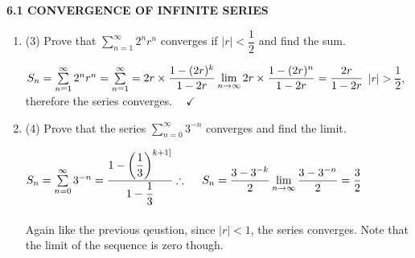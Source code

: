\documentclass[fleqn]{article}
\begin{document}
  \textbf{6.1 CONVERGENCE OF INFINITE SERIES}
  \begin{enumerate}

          

    \item (3) Prove that $\sum\limits_{n=1}^{\infty} 2^n r^n$ converges if $|r| < \dfrac{1}{2}$ and find the sum. 

      \textcolor{hwColor}{
        $
          S_n=\sum\limits_{n=1}^{\infty} 2^n r^n
          =\sum\limits_{n=1}^{\infty}=2r \times \dfrac{1-(2r)^k}{1-2r}
          \\
          \\
          \\
          \lim\limits_{n \to \infty} 2r \times \dfrac{1-(2r)^n}{1-2r}=\dfrac{2r}{1-2r}
          \\
          \\
        $
        $|r|>\dfrac{1}{2}$, therefore the series converges. $~~~~ \checkmark$
        \\
      }

    \item (4) Prove that the series $\sum\limits_{n=0}^{\infty} 3^{-n}$ converges and find the limit. 

      \textcolor{hwColor}{
        $
          S_n=\sum\limits_{n=0}^{\infty} 3^{-n}=\dfrac{1-\left(\dfrac{1}{3}\right)^{k+1]}}{1-\dfrac{1}{3}}
          \\
          \\
          \\
          \therefore ~~~~ S_n=\dfrac{3-3^{-k}}{2}
          \\
          \\
          \\
          \lim\limits_{n \to \infty} \dfrac{3-3^{-n}}{2}=\dfrac{3}{2}
        $
        \\
        \\
        Again like the previous qeustion, since $|r|<1$, the series converges. Note that the limit of the sequence is zero though.
      }

 
          

  \end{enumerate}
\end{document}
